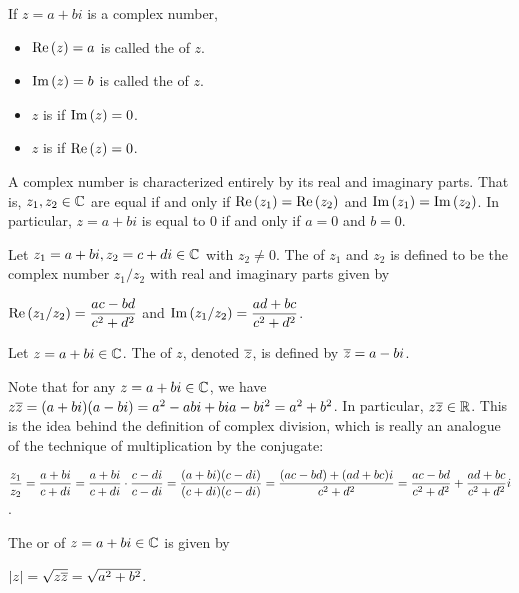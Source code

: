\documentclass[11pt,fleqn,dvipsnames,usenames]{article}
\newcommand{\p}{\noindent}
\begin{document}
\begin{definition}
If $z = a + bi$ is a complex number,
\begin{itemize}
\item $\text{Re}\left(z\right) = a$ is called the  of $z$.
\item $\text{Im}\left(z\right) = b$ is called the  of $z$. 
\item $z$ is  if $\text{Im}\left(z\right) = 0$.
\item $z$ is  if $\text{Re}\left(z\right) = 0$.
\end{itemize}
\end{definition}

\note A complex number is characterized entirely by its real and imaginary parts.  That is, $z_{1},z_{2}\in\mathbb{C}$ are equal if and only if $\text{Re}\left(z_{1}\right) = \text{Re}\left(z_{2}\right)$ and $\text{Im}\left(z_{1}\right) = \text{Im}\left(z_{2}\right)$.  In particular, $z = a + bi$ is equal to $0$ if and only if $a = 0$ and $b = 0$.

\begin{definition}
Let $z_{1} = a+bi,z_{2} = c+di\in\mathbb{C}$ with $z_{2}\neq 0$.  The  of $z_{1}$ and $z_{2}$ is defined to be the complex number $z_{1}/z_{2}$ with real and imaginary parts given by
\begin{center}
$\text{Re}\left(z_{1}/z_{2}\right) = \dfrac{ac - bd}{c^2 + d^2}$ and $\text{Im}\left(z_{1}/z_{2}\right) = \dfrac{ad + bc}{c^2 + d^2}$.
\end{center}
\end{definition}

\begin{definition}
Let $z = a + bi\in\mathbb{C}$.  The  of $z$, denoted $\overline{z}$, is defined by $\overline{z} = a - bi$.
\end{definition}
\vsp

\p Note that for any $z = a + bi\in\mathbb{C}$, we have $z\overline{z} = (a + bi)(a - bi) = a^2 - abi + bia - bi^2 = a^2 + b^2$.  In particular, $z\overline{z}\in\mathbb{R}$.  This is the idea behind the definition of complex division, which is really an analogue of the technique of {multiplication by the conjugate}:

\begin{center}
$\displaystyle{\frac{z_{1}}{z_{2}} = \frac{a + bi}{c + di} = \frac{a + bi}{c + di}\cdot \frac{c - di}{c - di} = \frac{(a + bi)(c - di)}{(c + di)(c - di)} = \frac{(ac - bd) + (ad + bc)i}{c^2 + d^2} = \frac{ac - bd}{c^2 + d^2} + \frac{ad + bc}{c^2 + d^2}i}$.
\end{center}

\begin{definition}
The  or  of $z = a+bi\in\mathbb{C}$ is given by
\begin{center}
$|z| = \sqrt{z\overline{z}} = \sqrt{a^2 + b^2}$.
\end{center}
\end{definition}
\end{document}

